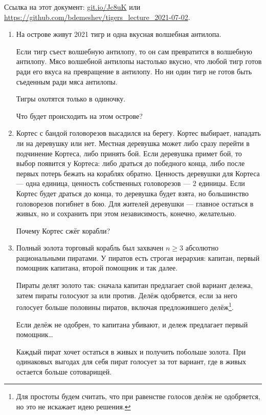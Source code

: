 \documentclass[12pt]{article} %
\theoremstyle{definition} %
\begin{document}
Ссылка на этот документ: \url{git.io/Jc8uK} или \url{https://github.com/bdemeshev/tigers_lecture_2021-07-02}.


\begin{enumerate}

\item На острове живут 2021 тигр и одна вкусная волшебная антилопа.

Если тигр съест волшебную антилопу, то он сам превратится в волшебную антилопу. 
Мясо волшебной антилопы настолько вкусно, что любой тигр готов ради его вкуса на превращение в антилопу. 
Но ни один тигр не готов быть съеденным ради мяса антилопы. 

Тигры охотятся только в одиночку.

Что будет происходить на этом острове?

\item Кортес с бандой головорезов высадился на берегу. 
Кортес выбирает, нападать ли на деревушку или нет. 
Местная деревушка может либо сразу перейти в подчинение Кортеса, либо принять бой.
Если деревушка примет бой, то выбор появится у Кортеса: либо драться до победного конца, либо
после первых потерь бежать на кораблях обратно. 
Ценность деревушки для Кортеса — одна единица, ценность собственных головорезов — 2 единицы. 
Если Кортес будет драться до конца, то деревушка будет взята, но большинство головорезов погибнет в бою. 
Для жителей деревушки — главное остаться в живых, но и сохранить при этом независимость, конечно, желательно.

Почему Кортес сжёг корабли?


\item Полный золота торговый корабль был захвачен $n \geq 3$ абсолютно рациональными пиратами.
У пиратов есть строгая иерархия: капитан, первый помощник капитана, второй помощник и так далее.

Пираты делят золото так: сначала капитан предлагает свой вариант дележа, затем пираты голосуют за или против.
Делёж одобряется, если за него голосует больше половины пиратов, 
включая предложившего делёж\footnote{Для простоты будем считать, что при равенстве голосов делёж не одобряется, но это не искажает идею решения.}.

Если делёж не одобрен, то капитана убивают, и дележ предлагает первый помощник\ldots

Каждый пират хочет остаться в живых и получить побольше золота. 
При одинаковых выгодах для себя пират голосует за тот вариант, где в живых остается больше сотоварищей.


\end{enumerate}
\end{document}
